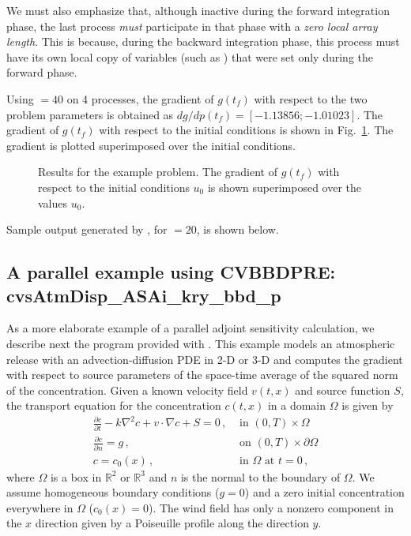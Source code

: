 We must also emphasize that, although inactive during the forward integration phase, 
the last process {\em must} participate in that phase with a 
{\em zero local array length}. 
This is because, during the backward integration phase, this process must
have its own local copy of variables (such as ) that were set
only during the forward phase.

Using  $=40$ on 4 processes, the gradient of $g(t_f)$ with respect to 
the two problem parameters is obtained as $dg/dp(t_f) = [ -1.13856; -1.01023]$.
The gradient of $g(t_f)$ with respect to the initial conditions is shown in
Fig.~\ref{f:cvsAdvDiff_ASAp_non_p}. The gradient is plotted superimposed over the
initial conditions.
\begin{figure}
  {\centerline{}}
  \caption{Results for the  example problem.
    The gradient of $g(t_f)$ with respect to the initial conditions $u_0$ 
    is shown superimposed over the values $u_0$.}
  \label{f:cvsAdvDiff_ASAp_non_p}
\end{figure}
Sample output generated by , for  $=20$, is
shown below.



\newpage
\subsection{A parallel example using CVBBDPRE: cvsAtmDisp\_ASAi\_kry\_bbd\_p}
\label{ss:cvsAtmDisp_ASAi_kry_bbd_p}

As a more elaborate example of a parallel adjoint sensitivity calculation,
we describe next the program  provided
with {\cvodes}. This example models an atmospheric 
release with an advection-diffusion PDE in 2-D or 3-D and computes the gradient 
with respect to source parameters of the space-time average of the squared norm
of the concentration.
Given a known velocity field $v(t,x)$ and source function $S$, the  transport
equation for the concentration $c(t,x)$ in a domain $\Omega$ is given by
\begin{equation}\label{e:cvsAtmDisp_ASAi_kry_bbd_p_PDE}
  \begin{split}
    \frac{\partial c}{\partial t} - k \nabla^2 c + v \cdot \nabla c + S = 0 \, , 
    &\text{ in } (0,T) \times \Omega \\
    \frac{\partial c}{\partial n} = g \, ,
    &\text{ on } (0,T) \times \partial\Omega \\
    c = c_0(x) \, ,
    &\text{ in } \Omega \text{ at } t = 0 \, ,
  \end{split}
\end{equation}
where $\Omega$ is a box in ${\mathbb{R}}^2$ or ${\mathbb{R}}^3$ and $n$ is the 
normal to the boundary of $\Omega$.
We assume homogeneous boundary conditions ($g = 0$) and a zero initial
concentration everywhere in $\Omega$ ($c_0(x) = 0$). The wind field has only a
nonzero component in the $x$ direction given by a Poiseuille profile along the 
direction $y$.

